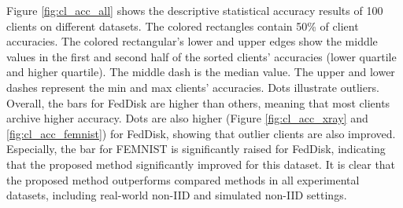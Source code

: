 \documentclass[journal]{IEEEtai}
\newcommand{\MethodnameShort}{FedDisk}
\newcommand\parties{100}
\begin{document}
Figure \ref{fig:cl_acc_all} shows the descriptive statistical accuracy results of \parties{} clients on different datasets. The colored rectangles contain 50\% of client accuracies. The colored rectangular's lower and upper edges show the middle values in the first and second half of the sorted clients' accuracies (lower quartile and higher quartile). The middle dash is the median value. The upper and lower dashes represent the min and max clients' accuracies. Dots illustrate outliers. Overall, the bars for \MethodnameShort{} are higher than others, meaning that most clients archive higher accuracy. Dots are also higher (Figure \ref{fig:cl_acc_xray} and \ref{fig:cl_acc_femnist}) for \MethodnameShort{}, showing that outlier clients are also improved. Especially, the bar for FEMNIST is significantly raised for \MethodnameShort{}, indicating that the proposed method significantly improved for this dataset. It is clear that the proposed method outperforms compared methods in all experimental datasets, including real-world non-IID and simulated non-IID settings.
\end{document}
